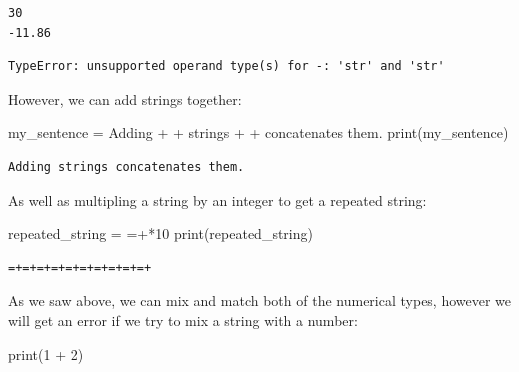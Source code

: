 \documentclass[
  letterpaper,
  DIV=11,
  numbers=noendperiod]{scrreprt}
\newenvironment{Shaded}{\begin{snugshade}}{\end{snugshade}}
\newcommand{\BuiltInTok}[1]{\textcolor[rgb]{0.00,0.23,0.31}{#1}}
\newcommand{\DecValTok}[1]{\textcolor[rgb]{0.68,0.00,0.00}{#1}}
\newcommand{\NormalTok}[1]{\textcolor[rgb]{0.00,0.23,0.31}{#1}}
\newcommand{\OperatorTok}[1]{\textcolor[rgb]{0.37,0.37,0.37}{#1}}
\newcommand{\StringTok}[1]{\textcolor[rgb]{0.13,0.47,0.30}{#1}}
\begin{document}
\begin{verbatim}
30
-11.86
\end{verbatim}

\begin{verbatim}
TypeError: unsupported operand type(s) for -: 'str' and 'str'
\end{verbatim}

However, we can add strings together:

\begin{Shaded}
\begin{Highlighting}[]
\NormalTok{my\_sentence }\OperatorTok{=} \StringTok{\textquotesingle{}Adding\textquotesingle{}} \OperatorTok{+} \StringTok{\textquotesingle{} \textquotesingle{}} \OperatorTok{+} \StringTok{\textquotesingle{}strings\textquotesingle{}} \OperatorTok{+} \StringTok{\textquotesingle{} \textquotesingle{}} \OperatorTok{+} \StringTok{\textquotesingle{}concatenates them.\textquotesingle{}}
\BuiltInTok{print}\NormalTok{(my\_sentence)}
\end{Highlighting}
\end{Shaded}

\begin{verbatim}
Adding strings concatenates them.
\end{verbatim}

As well as multipling a string by an integer to get a repeated string:

\begin{Shaded}
\begin{Highlighting}[]
\NormalTok{repeated\_string }\OperatorTok{=} \StringTok{\textquotesingle{}=+\textquotesingle{}}\OperatorTok{*}\DecValTok{10}
\BuiltInTok{print}\NormalTok{(repeated\_string)}
\end{Highlighting}
\end{Shaded}

\begin{verbatim}
=+=+=+=+=+=+=+=+=+=+
\end{verbatim}

As we saw above, we can mix and match both of the numerical types,
however we will get an error if we try to mix a string with a number:

\begin{Shaded}
\begin{Highlighting}[]
\BuiltInTok{print}\NormalTok{(}\DecValTok{1} \OperatorTok{+} \StringTok{\textquotesingle{}2\textquotesingle{}}\NormalTok{)}
\end{Highlighting}
\end{Shaded}
\end{document}
